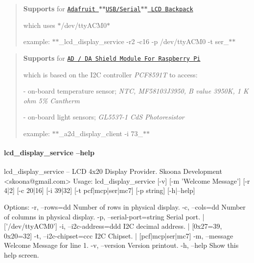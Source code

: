 \begin{quote}
{\bfseries Supports} for \href{https://www.adafruit.com/products/782}{\tt \textquotesingle{}Adafruit $\ast$$\ast$\+U\+S\+B/\+Serial$\ast$$\ast$ L\+C\+D Backpack\textquotesingle{}}
\begin{DoxyItemize}
\item which uses $\ast$/dev/tty\+A\+C\+M0$\ast$
\item example\+: $\ast$$\ast$\+\_\+lcd\+\_\+display\+\_\+service -\/r2 -\/c16 -\/p /dev/tty\+A\+C\+M0 -\/t ser\+\_\+$\ast$$\ast$ 
\end{DoxyItemize}\end{quote}


\begin{quote}
{\bfseries Supports} for \href{http://www.amazon.com/Shield-Module-For-Raspberry-Arduino/dp/B00WGW48A8}{\tt \textquotesingle{}A\+D / D\+A Shield Module For Raspberry Pi\textquotesingle{}}
\begin{DoxyItemize}
\item which is based on the I2\+C controller {\itshape P\+C\+F8591\+T} to access\+:
\item -\/ on-\/board temperature sensor; {\itshape N\+T\+C, M\+F58103\+J3950, B value 3950\+K, 1 K ohm 5\% Cantherm}
\item -\/ on-\/board light sensors; {\itshape G\+L5537-\/1 Cd\+S Photoresistor}
\item example\+: $\ast$$\ast$\+\_\+a2d\+\_\+display\+\_\+client -\/i 73\+\_\+$\ast$$\ast$ 
\end{DoxyItemize}\end{quote}


\paragraph*{lcd\+\_\+display\+\_\+service --help}

\begin{DoxyVerb}lcd_display_service -- LCD 4x20 Display Provider.
          Skoona Development <skoona@gmail.com>
Usage:
  lcd_display_service [-v] [-m 'Welcome Message'] [-r 4|2] [-c 20|16] [-i 39|32] [-t pcf|mcp|ser|mc7] [-p string] [-h|--help]

Options:
  -r, --rows=dd  Number of rows in physical display.
  -c, --cols=dd  Number of columns in physical display.
  -p, --serial-port=string Serial port.       | ['/dev/ttyACM0']
  -i, --i2c-address=ddd  I2C decimal address. | [0x27=39, 0x20=32]
  -t, --i2c-chipset=ccc  I2C Chipset.         | [pcf|mcp|ser|mc7]
  -m, --message  Welcome Message for line 1.
  -v, --version  Version printout.
  -h, --help     Show this help screen.
\end{DoxyVerb}


